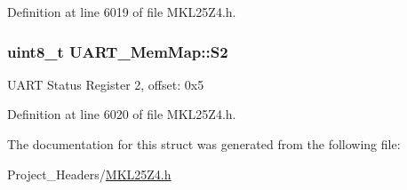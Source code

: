 Definition at line 6019 of file M\+K\+L25\+Z4.\+h.

\subsubsection[{\texorpdfstring{S2}{S2}}]{\setlength{\rightskip}{0pt plus 5cm}uint8\+\_\+t U\+A\+R\+T\+\_\+\+Mem\+Map\+::\+S2}\hypertarget{struct_u_a_r_t___mem_map_a6107c55f4dba727e1a4e70f76acd7b20}{}\label{struct_u_a_r_t___mem_map_a6107c55f4dba727e1a4e70f76acd7b20}
U\+A\+RT Status Register 2, offset\+: 0x5 

Definition at line 6020 of file M\+K\+L25\+Z4.\+h.



The documentation for this struct was generated from the following file\+:\begin{DoxyCompactItemize}
\item 
Project\+\_\+\+Headers/\hyperlink{_m_k_l25_z4_8h}{M\+K\+L25\+Z4.\+h}\end{DoxyCompactItemize}
